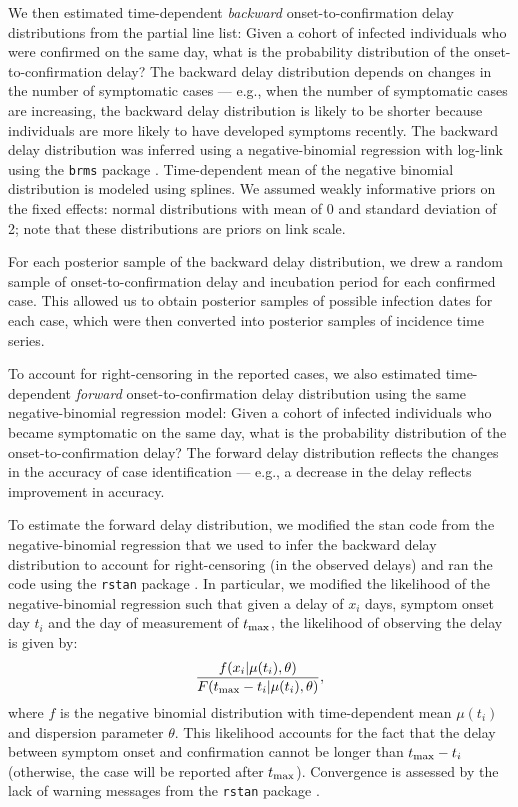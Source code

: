 We then estimated time-dependent \emph{backward} onset-to-confirmation delay distributions from the partial line list: Given a cohort of infected individuals who were confirmed on the same day, what is the probability distribution of the onset-to-confirmation delay?
The backward delay distribution depends on changes in the number of symptomatic cases ---
e.g., when the number of symptomatic cases are increasing, the backward delay distribution is likely to be shorter because individuals are more likely to have developed symptoms recently.
The backward delay distribution was inferred using a negative-binomial regression with log-link using the \texttt{brms} package \citep{burkner2017brms}.
Time-dependent mean of the negative binomial distribution is modeled using splines.
We assumed weakly informative priors on the fixed effects: normal distributions with mean of 0 and standard deviation of 2;
note that these distributions are priors on link scale.

For each posterior sample of the backward delay distribution, we drew a random sample of onset-to-confirmation delay and incubation period for each confirmed case. 
This allowed us to obtain posterior samples of possible infection dates for each case,
which were then converted into posterior samples of incidence time series.

To account for right-censoring in the reported cases, we also estimated time-dependent \emph{forward} onset-to-confirmation delay distribution using the same negative-binomial regression model: Given a cohort of infected individuals who became symptomatic on the same day, what is the probability distribution of the onset-to-confirmation delay?
The forward delay distribution reflects the changes in the accuracy of case identification --- e.g., a decrease in the delay reflects improvement in accuracy.

To estimate the forward delay distribution, we modified the stan code from the negative-binomial regression that we used to infer the backward delay distribution to account for right-censoring (in the observed delays) and ran the code using the \texttt{rstan} package \citep{rstan}.
In particular, we modified the likelihood of the negative-binomial regression such that given a delay of $x_i$ days, symptom onset day $t_i$ and the day of measurement of $t_{\tiny\textrm{max}}$, the likelihood of observing the delay is given by:
\begin{equation}
\frac{f(x_i|\mu(t_i), \theta)}{F(t_{\tiny\textrm{max}}-t_i|\mu(t_i), \theta)},
\end{equation}
where $f$ is the negative binomial distribution with time-dependent mean $\mu(t_i)$ and dispersion parameter $\theta$. This likelihood accounts for the fact that the delay between symptom onset and confirmation cannot be longer than $t_{\tiny\textrm{max}}-t_i$ (otherwise, the case will be reported after $t_{\tiny\textrm{max}}$). Convergence is assessed by the lack of warning messages from the \texttt{rstan} package \citep{rstan}.

